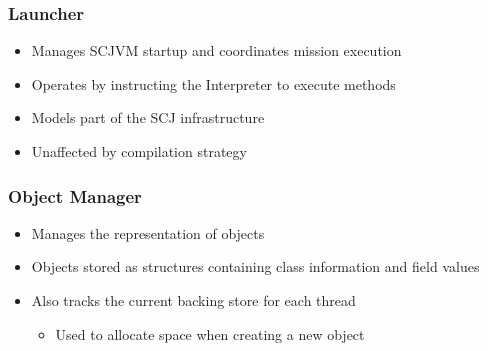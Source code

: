 \documentclass{beamer}
\begin{document}
\begin{frame}
  \frametitle{Launcher}
  \begin{itemize}
  \item Manages SCJVM startup and coordinates mission execution
  \item Operates by instructing the Interpreter to execute methods
  \item Models part of the SCJ infrastructure
  \item Unaffected by compilation strategy
  \end{itemize}
\end{frame}

\begin{frame}
  \frametitle{Object Manager}
  \begin{itemize}
  \item Manages the representation of objects
  \item Objects stored as structures containing class information and field values
  \item Also tracks the current backing store for each thread
    \begin{itemize}
    \item Used to allocate space when creating a new object
    \end{itemize}
  \end{itemize}
\end{frame}
\end{document}
